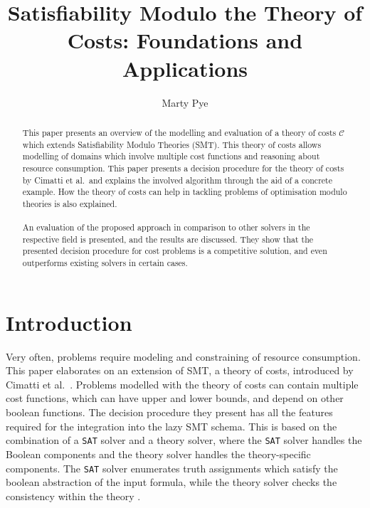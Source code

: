 \documentclass{amsart}
\theoremstyle{definition}
\theoremstyle{remark}
\numberwithin{equation}{section}
\def\C{$\mathcal{C}$}
\def\sat{\texttt{SAT}}
\begin{document}
  \title[Satisfiability Modulo the Theory of Costs]{Satisfiability Modulo the Theory of Costs: Foundations and Applications}

  \author{Marty Pye}
  \address{RWTH Aachen University}

  \begin{abstract}
    This paper presents an overview of the modelling and evaluation of a theory of costs \C{} which extends Satisfiability Modulo Theories (SMT). This theory of costs allows modelling of domains which involve multiple cost functions and reasoning about resource consumption. This paper presents a decision procedure for the theory of costs by Cimatti et al.\ and explains the involved algorithm through the aid of a concrete example. How the theory of costs can help in tackling problems of optimisation modulo theories is also explained.
    \\\\
    An evaluation of the proposed approach in comparison to other solvers in the respective field is presented, and the results are discussed. They show that the presented decision procedure for cost problems is a competitive solution, and even outperforms existing solvers in certain cases.
  \end{abstract}

  \maketitle

  \section{Introduction}

  Very often, problems require modeling and constraining of resource consumption. This paper elaborates on an extension of SMT, a theory of costs, introduced by Cimatti et al.\ \cite{Cimatti10}. Problems modelled with the theory of costs can contain multiple cost functions, which can have upper and lower bounds, and depend on other boolean functions. The decision procedure they present has all the features required for the integration into the lazy SMT schema. This is based on the combination of a \sat{} solver and a theory solver, where the \sat{} solver handles the Boolean components and the theory solver handles the theory-specific components. The \sat{} solver enumerates truth assignments which satisfy the boolean abstraction of the input formula, while the theory solver checks the consistency within the theory \cite{Sebastiani07}. \\
  
\end{document}
